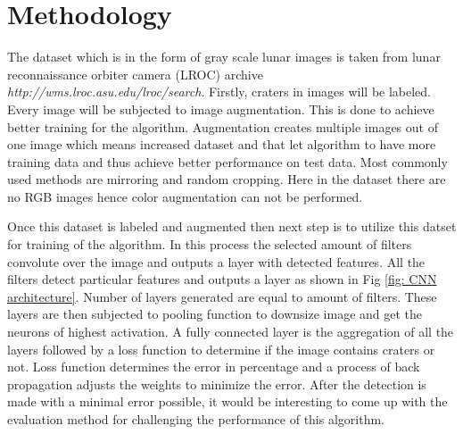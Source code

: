 \documentclass[11pt]{article}
\begin{document}


\section{Methodology}
The dataset which is in the form of gray scale lunar images is taken from lunar reconnaissance orbiter camera (LROC) archive \textit{http://wms.lroc.asu.edu/lroc/search}. Firstly, craters in images will be labeled. Every image will be subjected to image augmentation. This is done to achieve better training for the algorithm. Augmentation creates multiple images out of one image which means increased dataset and that let algorithm to have more training data and thus achieve better performance on test data. Most commonly used methods are mirroring and random cropping. Here in the dataset there are no RGB images hence color augmentation can not be performed.


Once this dataset is labeled and augmented then next step is to utilize this datset for training of the algorithm. In this process the selected amount of filters convolute over the image and outputs a layer with detected features. All the filters detect particular features and outputs a layer as shown in Fig \ref{fig: CNN architecture}. Number of layers generated are equal to amount of filters. These layers are then subjected to pooling function to downsize image and get the neurons of highest activation. A fully connected layer is the aggregation of all the layers followed by a loss function to determine if the image contains craters or not. Loss function determines the error in percentage and a process of back propagation adjusts the weights to minimize the error. After the detection is made with a minimal error possible, it would be interesting to come up with the evaluation method for challenging the performance of this algorithm.

\newpage




	


\end{document}
